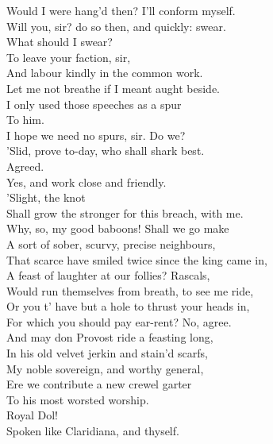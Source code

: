 \documentclass{memoir}
\begin{document}
\begin{drama*}
\subtlespeaks {} Would I were hang'd then? I'll conform myself.\\
\dolspeaks  Will you, sir? do so then, and quickly: swear.\\
\subtlespeaks  What should I swear?\\
\dolspeaks {} To leave your faction, sir,\\
 And labour kindly in the common work.\\
\subtlespeaks  Let me not breathe if I meant aught beside.\\
 I only used those speeches as a spur\\
 To him.\\
\dolspeaks {} I hope we need no spurs, sir. Do we?\\
\facespeaks  'Slid, prove to-day, who shall shark best.\\
\subtlespeaks {} Agreed.\\
\dolspeaks  Yes, and work close and friendly.\\
\subtlespeaks {} 'Slight, the knot\\
 Shall grow the stronger for this breach, with me.\\
\dolspeaks  Why, so, my good baboons! Shall we go make\\
 A sort of sober, scurvy, precise neighbours,\\
 That scarce have smiled twice since the king came in,\\
 A feast of laughter at our follies? Rascals,\\
 Would run themselves from breath, to see me ride,\\
 Or you t' have but a hole to thrust your heads in,\\
 For which you should pay ear-rent? No, agree.\\
 And may don Provost ride a feasting long,\\
 In his old velvet jerkin and stain'd scarfs,\\
 My noble sovereign, and worthy general,\\
 Ere we contribute a new crewel garter\\
 To his most worsted worship.\\
\subtlespeaks {} Royal Dol!\\
 Spoken like Claridiana, and thyself.\\

\end{drama*}
\end{document}
